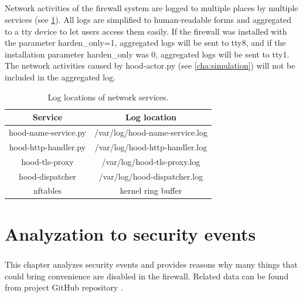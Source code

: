 \documentclass[mscthesis]{usiinfthesis}
\begin{document}
\paragraph{}
Network activities of the firewall system are logged to multiple places by multiple services (see \cref{tab:network_log}). All logs are simplified to human-readable forms and aggregated to a tty device to let users access them easily. If the firewall was installed with the parameter harden\_only=1, aggregated logs will be sent to tty8, and if the installation parameter harden\_only was 0, aggregated logs will be sent to tty1. The network activities caused by hood-actor.py (see \cref{cha:simulation}) will not be included in the aggregated log.
\begin{table}[H]
  \centering
  \begin{tabular}{|c|c|}
    \hline
    Service              & Log location                   \\
    \hline
    hood-name-service.py & /var/log/hood-name-service.log \\
    hood-http-handler.py & /var/log/hood-http-handler.log \\
    hood-tls-proxy       & /var/log/hood-tls-proxy.log    \\
    hood-dispatcher      & /var/log/hood-dispatcher.log   \\
    nftables             & kernel ring buffer             \\
    \hline
  \end{tabular}
  \caption{Log locations of network services.}
  \label{tab:network_log}
\end{table}



\chapter{Analyzation to security events}\label{cha:events}
\paragraph{}
This chapter analyzes security events and provides reasons why many things that could bring convenience are disabled in the firewall. Related data can be found from project GitHub repository \citep{hood:github}.
\end{document}
